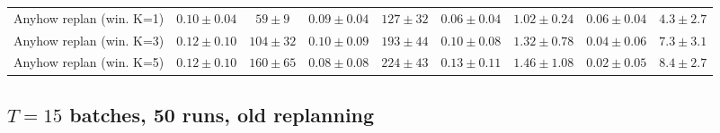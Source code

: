 \documentclass{uai2026} %
\newcommand{\1}{\mathbf{1}}
\begin{document}
\begin{table}[ht]
\begin{tabular}{@{}l|cc|cc|cc|cc@{}}
    Anyhow replan (win. K=1) & $0.10{\pm}0.04$               & $59{\pm}9$   & $0.09{\pm}0.04$ & $127{\pm}32$ & $0.06{\pm}0.04$ & $1.02{\pm}0.24$ & $0.06{\pm}0.04$ & $4.3{\pm}2.7$  \\
    Anyhow replan (win. K=3) & $0.12{\pm}0.10$               & $104{\pm}32$ & $0.10{\pm}0.09$ & $193{\pm}44$ & $0.10{\pm}0.08$ & $1.32{\pm}0.78$ & $0.04{\pm}0.06$ & $7.3{\pm}3.1$  \\
    Anyhow replan (win. K=5) & $0.12{\pm}0.10$               & $160{\pm}65$ & $0.08{\pm}0.08$ & $224{\pm}43$ & $0.13{\pm}0.11$ & $1.46{\pm}1.08$ & $0.02{\pm}0.05$ & $8.4{\pm}2.7$  \\
    \bottomrule
  \end{tabular}
\end{table}

\subsection{$T = 15$ batches, 50 runs, old replanning}
\label{app:results-15-50-old}
\end{document}
